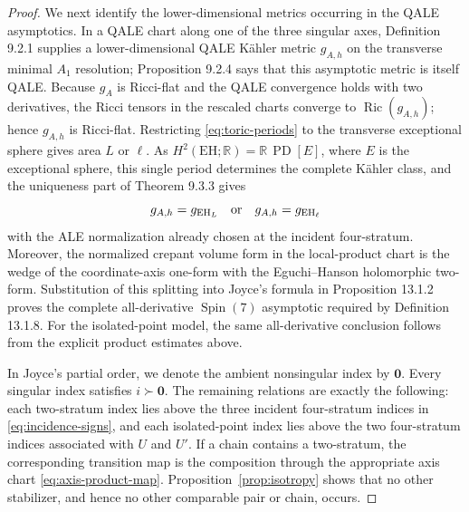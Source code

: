 \documentclass[11pt]{article}
\theoremstyle{remark}\newtheorem{remark}[theorem]{Remark}
\newcommand{\SpinSeven}{\operatorname{Spin}(7)}
\newcommand{\EH}{\mathrm{EH}}
\newcommand{\R}{\mathbb R}
\begin{document}
\begin{proof}
We next identify the lower-dimensional metrics occurring in the QALE
asymptotics.  In a QALE chart
along one of the three singular axes, Definition 9.2.1 supplies a
lower-dimensional QALE K\"ahler metric $g_{A,h}$ on the transverse minimal
$A_1$ resolution; Proposition 9.2.4 says that this asymptotic metric is
itself QALE.  Because $g_A$ is Ricci-flat and the QALE convergence holds
with two derivatives, the Ricci tensors in the rescaled charts converge
to $\operatorname{Ric}(g_{A,h})$; hence $g_{A,h}$ is Ricci-flat.
Restricting \eqref{eq:toric-periods} to the transverse exceptional sphere
gives area $L$ or $\ell$.  As
$H^2(\EH;\R)=\R\,\operatorname{PD}[E]$, where $E$ is the exceptional
sphere, this single period determines the complete K\"ahler class, and the
uniqueness part of Theorem 9.3.3 gives
\[
 g_{A,h}=g_{\EH_L}\quad\hbox{or}\quad g_{A,h}=g_{\EH_\ell}
\]
with the ALE normalization already chosen at the incident four-stratum.
Moreover, the normalized crepant volume form in the local-product chart is
the wedge of the coordinate-axis one-form with the Eguchi--Hanson
holomorphic two-form.  Substitution of this splitting into Joyce's formula
in Proposition 13.1.2 proves the complete all-derivative $\SpinSeven$
asymptotic required by Definition 13.1.8.  For the isolated-point model,
the same all-derivative conclusion follows from the explicit product
estimates above.

In Joyce's partial order, we denote the ambient nonsingular index by
$\mathbf 0$.  Every singular index satisfies $i\succ\mathbf 0$.  The
remaining relations are exactly the following: each two-stratum index lies
above the three incident four-stratum indices in
\eqref{eq:incidence-signs}, and each isolated-point index lies above the two
four-stratum indices associated with $U$ and $U'$.  If a chain contains a
two-stratum, the corresponding transition map is the composition through
the appropriate axis chart \eqref{eq:axis-product-map}.
Proposition~\ref{prop:isotropy} shows that no other stabilizer, and hence no
other comparable pair or chain, occurs.


\end{proof}
\end{document}
